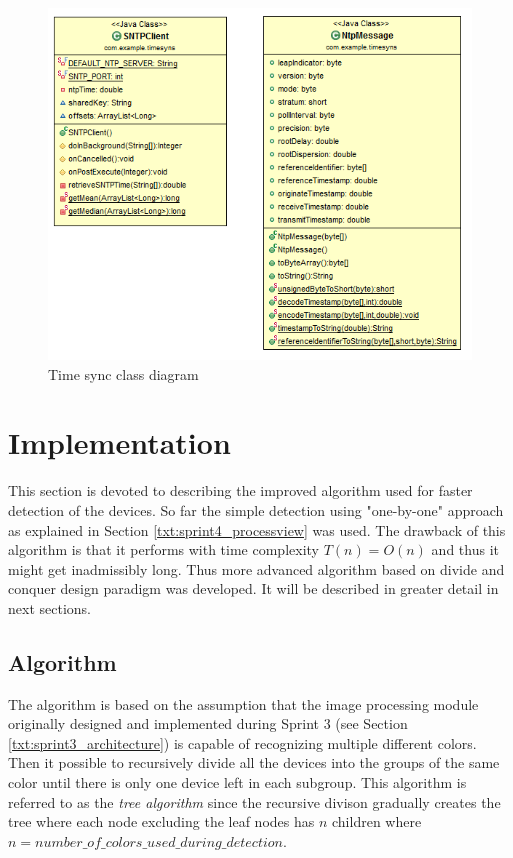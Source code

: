 \begin{figure}[H]
	\centering
		\includegraphics[width=14cm]{sprint5/sprint5_class_diagram.png}
	\caption{Time sync class diagram}
	\label{fig:Time_Sync_class }
\end{figure}

\section{Implementation} \label{txt:sprint5_immplementation}
This section is devoted to describing the improved algorithm used for faster detection of the devices. So far the simple detection using "one-by-one" approach as explained in Section \ref{txt:sprint4_processview} was used. The drawback of this algorithm is that it performs with time complexity $T(n) = O(n)$ and thus it might get inadmissibly long. Thus more advanced algorithm based on divide and conquer design paradigm was developed. It will be described in greater detail in next sections.

\subsection{Algorithm}
The algorithm is based on the assumption that the image processing module originally designed and implemented during Sprint 3 (see Section \ref{txt:sprint3_architecture}) is capable of recognizing multiple different colors. Then it possible to recursively divide all the devices into the groups of the same color until there is only one device left in each subgroup. This algorithm is referred to as the \textit{tree algorithm} since the recursive divison gradually creates the tree where each node excluding the leaf nodes has $n$ children where $n = number\_of\_colors\_used\_during\_detection$.

